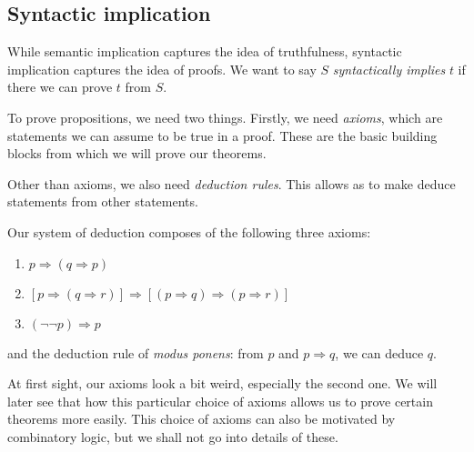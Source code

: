 \documentclass[a4paper]{article}
\begin{document}
\subsection{Syntactic implication}
While semantic implication captures the idea of truthfulness, syntactic implication captures the idea of proofs. We want to say $S$ \emph{syntactically implies} $t$ if there we can prove $t$ from $S$.

To prove propositions, we need two things. Firstly, we need \emph{axioms}, which are statements we can assume to be true in a proof. These are the basic building blocks from which we will prove our theorems.

Other than axioms, we also need \emph{deduction rules}. This allows as to make deduce statements from other statements.

Our system of deduction composes of the following three axioms:
\begin{enumerate}[label=\arabic{*}.]
  \item $p\Rightarrow(q\Rightarrow p)$
  \item $[p\Rightarrow(q\Rightarrow r)]\Rightarrow[(p\Rightarrow q)\Rightarrow(p \Rightarrow r)]$
  \item $(\neg\neg p)\Rightarrow p$
\end{enumerate}
and the deduction rule of \emph{modus ponens}: from $p$ and $p\Rightarrow q$, we can deduce $q$.

At first sight, our axioms look a bit weird, especially the second one. We will later see that how this particular choice of axioms allows us to prove certain theorems more easily. This choice of axioms can also be motivated by combinatory logic, but we shall not go into details of these.
\end{document}
